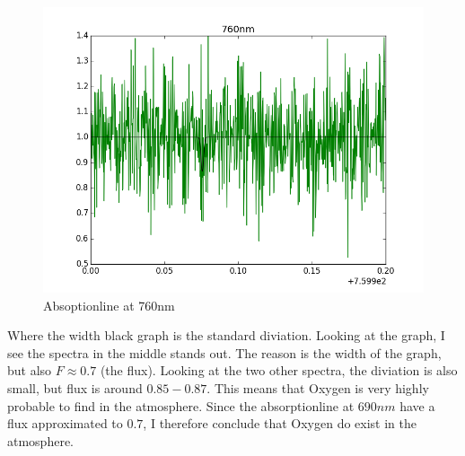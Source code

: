 \documentclass[a4paper,11pt,english]{report}
\begin{document}
\begin{figure}[!htb]
  \includegraphics[scale = 0.33]{760nm.png}
  \caption{Absoptionline at 760nm}
  \endminipage
\end{figure}
Where the width black graph is the standard diviation. Looking at the graph, I
see the spectra in the middle stands out. The reason is the width of the graph,
but also  \(F \approx 0.7\) (the flux). Looking at the two other spectra, the diviation is
also small, but flux is around \(0.85-0.87\). This means that Oxygen is very
highly probable to find in the atmosphere. Since the absorptionline at
\(690nm\) have a flux approximated to \(0.7\), I therefore conclude that Oxygen
do exist in the atmosphere.
\newpage
\end{document}
